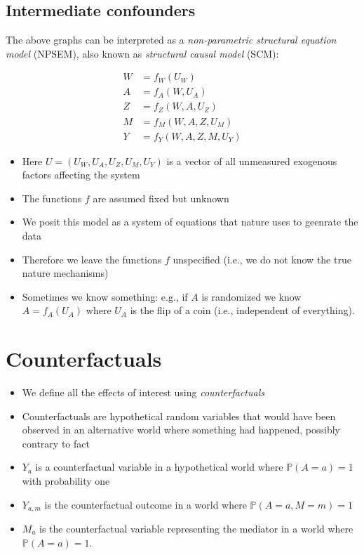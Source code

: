 \documentclass[
  12pt,
]{book}
\providecommand{\tightlist}{%
  \setlength{\itemsep}{0pt}\setlength{\parskip}{0pt}}
\theoremstyle{definition}
\theoremstyle{definition}
\theoremstyle{definition}
\renewcommand{\P}{\mathbb{P}}
\newcommand{\1}{\mathbbm{1}}
\begin{document}
\hypertarget{intermediate-confounders}{%
\subsection{Intermediate confounders}\label{intermediate-confounders}}

The above graphs can be interpreted as a \emph{non-parametric structural equation model}
(NPSEM), also known as \emph{structural causal model} (SCM):

\begin{align}
  W & = f_W(U_W)\\
  A & = f_A(W, U_A)\\
  Z & = f_Z(W, A, U_Z)\\
  M & = f_M(W, A, Z, U_M)\\
  Y & = f_Y(W, A, Z, M, U_Y)
\end{align}

\begin{itemize}
\tightlist
\item
  Here \(U=(U_W, U_A, U_Z, U_M, U_Y)\) is a vector of all unmeasured exogenous
  factors affecting the system
\item
  The functions \(f\) are assumed fixed but unknown
\item
  We posit this model as a system of equations that nature uses to geenrate the
  data
\item
  Therefore we leave the functions \(f\) unspecified (i.e., we do not know the
  true nature mechanisms)
\item
  Sometimes we know something: e.g., if \(A\) is randomized we know \(A=f_A(U_A)\)
  where \(U_A\) is the flip of a coin (i.e., independent of everything).
\end{itemize}

\hypertarget{counterfactuals}{%
\section{Counterfactuals}\label{counterfactuals}}

\begin{itemize}
\tightlist
\item
  We define all the effects of interest using \emph{counterfactuals}
\item
  Counterfactuals are hypothetical random variables that would have been
  observed in an alternative world where something had happened, possibly
  contrary to fact 
\item
  \(Y_a\) is a counterfactual variable in a hypothetical world where \(\P(A=a)=1\)
  with probability one
\item
  \(Y_{a,m}\) is the counterfactual outcome in a world where \(\P(A=a,M=m)=1\)
\item
  \(M_a\) is the counterfactual variable representing the mediator in a world
  where \(\P(A=a)=1\).
\end{itemize}
\end{document}

